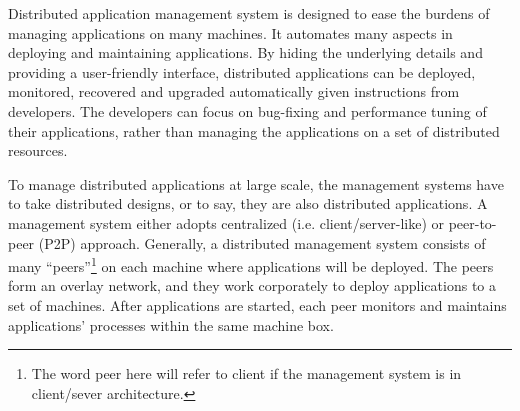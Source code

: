 



Distributed application management system is designed to
ease the burdens of managing applications on many machines.
It automates many aspects in deploying and maintaining
applications. By hiding the underlying details and providing
a user-friendly interface, distributed applications can be
deployed, monitored, recovered and upgraded automatically
given instructions from developers. The developers can focus
on bug-fixing and performance tuning of their applications,
rather than managing the applications on a set of
distributed resources.

To manage distributed applications at large scale, the
management systems have to take distributed designs, or to
say, they are also distributed applications. A management
system either adopts centralized (i.e. client/server-like)
or peer-to-peer (P2P) approach.  Generally, a distributed
management system consists of many ``peers''\footnote{The
word peer here will refer to client if the management system
is in client/sever architecture.} on each machine where
applications will be deployed. The peers form an overlay
network, and they work corporately to deploy applications to
a set of machines. After applications are started, each peer
monitors and maintains applications' processes within the
same machine box.

